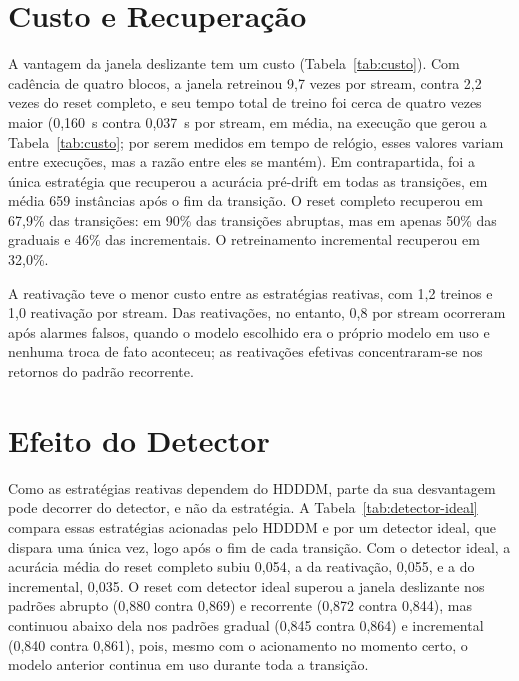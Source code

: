 \section{Custo e Recuperação}
\label{sec:res_custo}

A vantagem da janela deslizante tem um custo (Tabela~\ref{tab:custo}). Com
cadência de quatro blocos, a janela retreinou 9,7 vezes por stream, contra
2,2 vezes do reset completo, e seu tempo total de treino foi cerca de quatro
vezes maior (0,160~s contra 0,037~s por stream, em média, na execução que
gerou a Tabela~\ref{tab:custo}; por serem medidos em tempo de relógio, esses
valores variam entre execuções, mas a razão entre eles se mantém). Em
contrapartida, foi a única estratégia que recuperou a acurácia pré-drift em
todas as transições, em média 659 instâncias após o fim da transição. O
reset completo recuperou em 67,9\% das transições: em 90\% das transições
abruptas, mas em apenas 50\% das graduais e 46\% das incrementais. O
retreinamento incremental recuperou em 32,0\%.

A reativação teve o menor custo entre as estratégias reativas, com 1,2
treinos e 1,0 reativação por stream. Das reativações, no entanto, 0,8 por
stream ocorreram após alarmes falsos, quando o modelo escolhido era o
próprio modelo em uso e nenhuma troca de fato aconteceu; as reativações
efetivas concentraram-se nos retornos do padrão recorrente.



\section{Efeito do Detector}
\label{sec:res_detector_ideal}

Como as estratégias reativas dependem do HDDDM, parte da sua desvantagem
pode decorrer do detector, e não da estratégia. A Tabela~\ref{tab:detector-ideal}
compara essas estratégias acionadas pelo HDDDM e por um detector ideal, que
dispara uma única vez, logo após o fim de cada transição. Com o detector
ideal, a acurácia média do reset completo subiu 0,054, a da reativação,
0,055, e a do incremental, 0,035. O reset com detector ideal superou a
janela deslizante nos padrões abrupto (0,880 contra 0,869) e recorrente
(0,872 contra 0,844), mas continuou abaixo dela nos padrões gradual (0,845
contra 0,864) e incremental (0,840 contra 0,861), pois, mesmo com o
acionamento no momento certo, o modelo anterior continua em uso durante toda
a transição.



